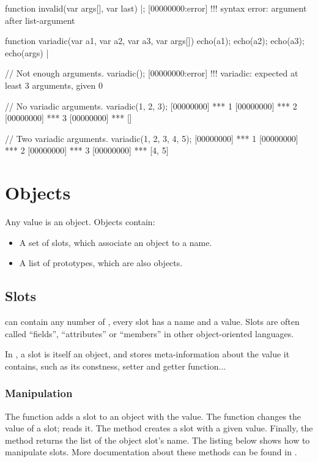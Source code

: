 \begin{urbiscript}
function invalid(var args[], var last)
{} |;
[00000000:error] !!! syntax error: argument after list-argument

function variadic(var a1, var a2, var a3, var args[])
{
  echo(a1);
  echo(a2);
  echo(a3);
  echo(args)
} |

// Not enough arguments.
variadic();
[00000000:error] !!! variadic: expected at least 3 arguments, given 0

// No variadic arguments.
variadic(1, 2, 3);
[00000000] *** 1
[00000000] *** 2
[00000000] *** 3
[00000000] *** []

// Two variadic arguments.
variadic(1, 2, 3, 4, 5);
[00000000] *** 1
[00000000] *** 2
[00000000] *** 3
[00000000] *** [4, 5]
\end{urbiscript}



\section{Objects}

Any \us value is an object. Objects contain:

\begin{itemize}
\item A set of slots, which associate an object to a name.
\item A list of prototypes, which are also objects.
\end{itemize}

\subsection{Slots}
\label{sec:lang:slots}

 can contain any number of , every slot has a name
and a value. Slots are often called ``fields'', ``attributes'' or
``members'' in other object-oriented languages.

In \us, a slot is itself an object, and stores meta-information about the value
it contains, such as its constness, setter and getter function...

\subsubsection{Manipulation}

The  function adds a slot to an object with the
 value. The  function changes
the value of a slot;  reads it. The
 method creates a slot with a given value. Finally,
the  method returns the list of the object
slot's name. The listing below shows how to manipulate slots. More
documentation about these methods can be found in .


